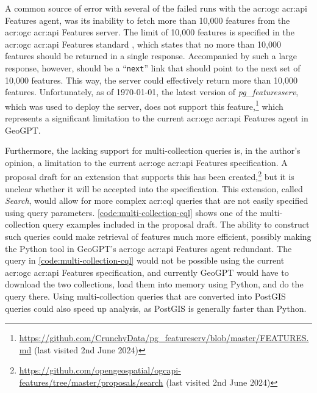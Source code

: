 A common source of error with several of the failed runs with the \acrshort{acr:ogc} \acrshort{acr:api} Features agent, was its inability to fetch more than 10,000 features from the \acrshort{acr:ogc} \acrshort{acr:api} Features server. The limit of 10,000 features is specified in the \acrshort{acr:ogc} \acrshort{acr:api} Features standard \citep{opengeospatialconsortiumOGCAPIFeatures2022}, which states that no more than 10,000 features should be returned in a single response. Accompanied by such a large response, however, should be a \enquote{\texttt{next}} link that should point to the next set of 10,000 features. This way, the server could effectively return more than 10,000 features. Unfortunately, as of \today, the latest version of \textit{pg\_featuresserv}, which was used to deploy the server, does not support this feature,\footnote{\url{https://github.com/CrunchyData/pg_featureserv/blob/master/FEATURES.md} (last visited 2nd June 2024)} which represents a significant limitation to the current \acrshort{acr:ogc} \acrshort{acr:api} Features agent in GeoGPT.

Furthermore, the lacking support for multi-collection queries is, in the author's opinion, a limitation to the current \acrshort{acr:ogc} \acrshort{acr:api} Features specification. A proposal draft for an extension that supports this has been created,\footnote{\url{https://github.com/opengeospatial/ogcapi-features/tree/master/proposals/search} (last visited 2nd June 2024)} but it is unclear whether it will be accepted into the specification. This extension, called \textit{Search}, would allow for more complex \acrshort{acr:cql} queries that are not easily specified using query parameters. \autoref{code:multi-collection-cql} shows one of the multi-collection query examples included in the proposal draft. The ability to construct such queries could make retrieval of features much more efficient, possibly making the Python tool in GeoGPT's \acrshort{acr:ogc} \acrshort{acr:api} Features agent redundant. The query in \autoref{code:multi-collection-cql} would not be possible using the current \acrshort{acr:ogc} \acrshort{acr:api} Features specification, and currently GeoGPT would have to download the two collections, load them into memory using Python, and do the query there. Using multi-collection queries that are converted into PostGIS queries could also speed up analysis, as PostGIS is generally faster than Python.



